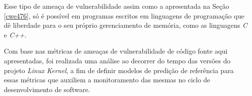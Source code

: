 Esse tipo de ameaça de vulnerabilidade assim como a apresentada na Seção
\ref{cwe476}, só é possível em programas escritos em linguagens de programação
que dê liberdade para o seu próprio gerenciamento de memória, como as linguagens
\textit{C} e \textit{C++}.



Com base nas métricas de ameaças de vulnerabilidade de código fonte aqui
apresentadas, foi realizada uma análise ao decorrer do tempo das versões do
projeto \textit{Linux Kernel}, a fim de definir modelos de predição de
referência para essas métricas que auxiliem a monitoramento das mesmas no ciclo
de desenvolvimento de software.


